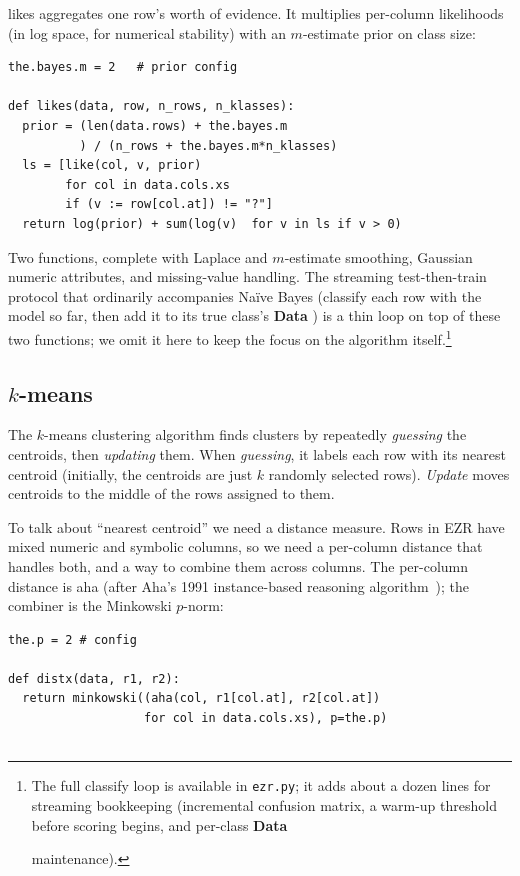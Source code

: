\documentclass[AMA,STIX2COL]{WileyNJDv5}
\newcommand{\IT}{{\sffamily EZR}}
\newcommand{\cls}[1]{%
  \setlength{\fboxsep}{1.5pt}%
  \colorbox{clsbg}{\sffamily\bfseries{#1}}%
}
\begin{document}
{\textsf{likes} aggregates one row's worth of evidence. It
multiplies per-column likelihoods (in log space, for numerical
stability) with an $m$-estimate prior on class size:

\begin{verbatim}
the.bayes.m = 2   # prior config

def likes(data, row, n_rows, n_klasses):
  prior = (len(data.rows) + the.bayes.m
          ) / (n_rows + the.bayes.m*n_klasses)
  ls = [like(col, v, prior)
        for col in data.cols.xs
        if (v := row[col.at]) != "?"]
  return log(prior) + sum(log(v)  for v in ls if v > 0)
\end{verbatim}
Two functions, complete with Laplace and $m$-estimate smoothing,
Gaussian numeric attributes, and missing-value handling. The
streaming test-then-train protocol that ordinarily accompanies
Naïve Bayes (classify each row with the model so far, then add
it to its true class's \cls{Data}) is a thin loop on top of
these two functions; we omit it here to keep the focus on the
algorithm itself.\footnote{The full \textsf{classify} loop is
available in \texttt{ezr.py}; it adds about a dozen lines for
streaming bookkeeping (incremental confusion matrix, a warm-up
threshold before scoring begins, and per-class \cls{Data}
maintenance).}

\subsection{$k$-means}\label{kluster}

The $k$-means clustering algorithm finds clusters by repeatedly
{\em guessing} the centroids, then {\em updating} them.  When
{\em guessing}, it labels each row with its nearest centroid
(initially, the centroids are just $k$ randomly selected rows).
{\em Update} moves centroids to the middle of the rows assigned
to them.

To talk about ``nearest centroid'' we need a distance measure. Rows in
\IT{} have mixed numeric and symbolic columns, so we need a
per-column distance that handles both, and a way to combine them
across columns. The per-column distance is \textsf{aha} (after
Aha's 1991 instance-based reasoning algorithm~\cite{aha91}); the
combiner is the Minkowski $p$-norm:\newpage

\begin{verbatim}
the.p = 2 # config

def distx(data, r1, r2):
  return minkowski((aha(col, r1[col.at], r2[col.at])
                   for col in data.cols.xs), p=the.p)


\end{verbatim}}
\end{document}
